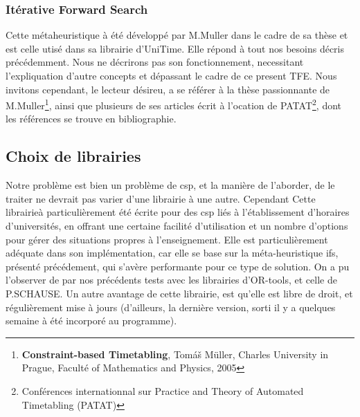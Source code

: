 \subsubsection{Itérative Forward Search}
Cette métaheuristique à été développé par M.Muller dans le cadre de sa thèse et est celle utisé dans sa librairie d'UniTime. 
Elle répond à tout nos besoins décris précédemment. Nous ne décrirons pas son fonctionnement, 
necessitant l'expliquation d'autre concepts et dépassant le cadre de ce present TFE. Nous invitons cependant, le lecteur désireu, a se référer à la thèse passionnante de M.Muller\footnote{\textbf{Constraint-based Timetabling}, Tomáš Müller, Charles University in Prague, Faculté of Mathematics and Physics, 2005}, ainsi que plusieurs de ses articles écrit à l'ocation de PATAT\footnote{Conférences internationnal sur Practice and Theory of Automated Timetabling (PATAT)}, dont les références se trouve en bibliographie.


\subsection{Choix de librairies}
Notre problème est bien un problème de csp, et la manière de l'aborder, de le traiter ne devrait pas varier d'une librairie à une autre.  Cependant Cette librairieà particulièrement été écrite pour des csp liés à l'établissement d'horaires d'universités, en offrant une certaine facilité d'utilisation et un nombre d'options pour gérer des situations propres à l'enseignement.
Elle est particulièrement adéquate dans son implémentation, car elle se base sur la méta-heuristique ifs, présenté précédement, qui s'avère performante pour ce type de solution.  On a pu l'observer de par nos précédents tests avec les librairies d'OR-tools, et celle de P.SCHAUSE.
\newline
\indent
Un autre avantage de cette librairie, est qu'elle est libre de droit, et régulièrement mise à jours (d'ailleurs, la dernière version, sorti il y a quelques semaine à été incorporé au programme).


